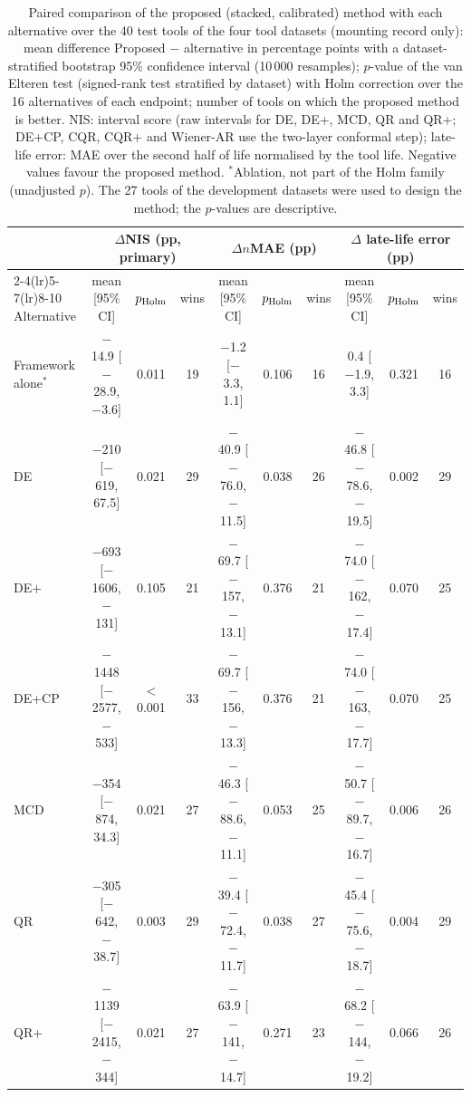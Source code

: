 \begin{table}[!tbp]
\centering
\caption{Paired comparison of the proposed (stacked, calibrated) method with each alternative over the 40 test tools of the four tool datasets (mounting record only): mean difference Proposed $-$ alternative in percentage points with a dataset-stratified bootstrap 95\% confidence interval (10\,000 resamples); $p$-value of the van Elteren test (signed-rank test stratified by dataset) with Holm correction over the 16 alternatives of each endpoint; number of tools on which the proposed method is better. NIS: interval score (raw intervals for DE, DE+, MCD, QR and QR+; DE+CP, CQR, CQR+ and Wiener-AR use the two-layer conformal step); late-life error: MAE over the second half of life normalised by the tool life. Negative values favour the proposed method. $^\ast$Ablation, not part of the Holm family (unadjusted $p$). The 27 tools of the development datasets were used to design the method; the $p$-values are descriptive.}
\label{tab:Ssignif_none}
\scriptsize\setlength{\tabcolsep}{2.6pt}
\begin{tabular}{lccccccccc}
\toprule
 & \multicolumn{3}{c}{$\Delta$NIS (pp, primary)} & \multicolumn{3}{c}{$\Delta n$MAE (pp)} & \multicolumn{3}{c}{$\Delta$ late-life error (pp)}\\
\cmidrule(lr){2-4}\cmidrule(lr){5-7}\cmidrule(lr){8-10}
Alternative & mean [95\% CI] & $p_{\rm Holm}$ & wins & mean [95\% CI] & $p_{\rm Holm}$ & wins & mean [95\% CI] & $p_{\rm Holm}$ & wins\\
\midrule
Framework alone$^\ast$ & $-$14.9 [$-$28.9, $-$3.6] & 0.011 & 19 & $-$1.2 [$-$3.3, 1.1] & 0.106 & 16 & 0.4 [$-$1.9, 3.3] & 0.321 & 16\\
\midrule
DE & $-$210 [$-$619, 67.5] & 0.021 & 29 & $-$40.9 [$-$76.0, $-$11.5] & 0.038 & 26 & $-$46.8 [$-$78.6, $-$19.5] & 0.002 & 29\\
DE+ & $-$693 [$-$1606, $-$131] & 0.105 & 21 & $-$69.7 [$-$157, $-$13.1] & 0.376 & 21 & $-$74.0 [$-$162, $-$17.4] & 0.070 & 25\\
DE+CP & $-$1448 [$-$2577, $-$533] & $<$0.001 & 33 & $-$69.7 [$-$156, $-$13.3] & 0.376 & 21 & $-$74.0 [$-$163, $-$17.7] & 0.070 & 25\\
MCD & $-$354 [$-$874, 34.3] & 0.021 & 27 & $-$46.3 [$-$88.6, $-$11.1] & 0.053 & 25 & $-$50.7 [$-$89.7, $-$16.7] & 0.006 & 26\\
QR & $-$305 [$-$642, $-$38.7] & 0.003 & 29 & $-$39.4 [$-$72.4, $-$11.7] & 0.038 & 27 & $-$45.4 [$-$75.6, $-$18.7] & 0.004 & 29\\
QR+ & $-$1139 [$-$2415, $-$344] & 0.021 & 27 & $-$63.9 [$-$141, $-$14.7] & 0.271 & 23 & $-$68.2 [$-$144, $-$19.2] & 0.066 & 26\\

\end{tabular}
\end{table}
